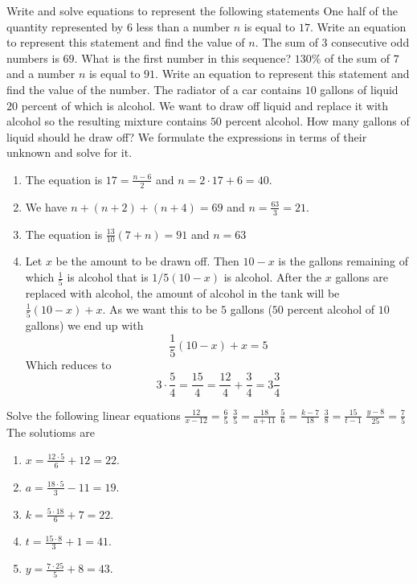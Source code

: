\begin{ExerciseList}
\Exercise Write and solve equations to represent the following statements
\Question One half of the quantity represented by $6$ less than a number
$n$ is equal to $17$. Write an equation to represent this statement and
find the value of $n$.
\Question The sum of $3$ consecutive odd numbers is $69$. What is the
first number in this sequence?
\Question $130\%$ of the sum of $7$ and a number $n$ is equal to $91$.
Write an equation to represent this statement and find the value of the
number.
\Question The radiator of a car contains $10$ gallons of liquid $20$
percent of which is alcohol. We want to draw off liquid and replace it
with alcohol so the resulting mixture contains $50$ percent alcohol. How
many gallons of liquid should he draw off?
\Answer We formulate the expressions in terms of their unknown and solve
for it.
\begin{enumerate}
\item \myindent The equation is $17=\frac{n-6}{2}$ and $n = 2 \cdot 17 + 6 = 40$.
\item \myindent We have $n + (n+2) + (n+4) = 69$ and $n = \frac{63}{3} = 21$.
\item \myindent The equation is $\frac{13}{10}(7 + n) = 91$ and $n = 63$
\item \myindent Let $x$ be the amount to be drawn off. Then $10 - x$ is the
gallons remaining of which $\frac{1}{5}$ is alcohol that is $1/5(10 - x)$
is alcohol. After the $x$ gallons are replaced with alcohol, the amount
of alcohol in the tank will be $\frac{1}{5}(10 - x) + x$. As we want this
to be $5$ gallons ($50$ percent alcohol of $10$ gallons) we end up with
\[
\frac{1}{5}(10 - x) + x = 5
\]
Which reduces to
\[
3 \cdot \frac{5}{4} = \frac{15}{4} = \frac{12}{4} + \frac{3}{4} = 3\frac{3}{4}
\]
\end{enumerate}

\Exercise Solve the following linear equations
\Question $\frac{12}{x-12} = \frac{6}{5}$
\Question $\frac{3}{5} = \frac{18}{a + 11}$
\Question $\frac{5}{6} = \frac{k-7}{18}$
\Question $\frac{3}{8} = \frac{15}{t-1}$
\Question $\frac{y-8}{25} = \frac{7}{5}$
\Answer The solutioms are
\begin{enumerate}
\item\myindent $x = \frac{12 \cdot 5}{6} + 12 = 22$.
\item\myindent $a = \frac{18 \cdot 5}{3} - 11 = 19$.
\item\myindent $k = \frac{5 \cdot 18}{6} + 7 = 22$.
\item\myindent $t = \frac{15 \cdot 8}{3} + 1 = 41$.
\item\myindent $y = \frac{7 \cdot 25}{5} + 8 = 43$.
\end{enumerate}


\end{ExerciseList}
